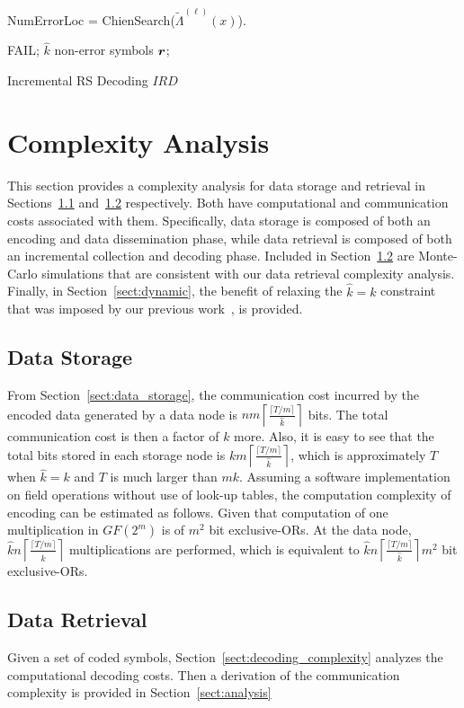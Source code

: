 \documentclass[10pt,journal,letterpaper,compsoc]{IEEEtran}
\newcommand{\bm}{\boldmath}
\newcommand{\rr}{\mbox{\bm $r$}}
\newcommand{\0}{{\bf 0}}
\begin{document}
\begin{algorithm}[h]
{NumErrorLoc = ChienSearch($\tilde\Lambda^{(\ell)}(x)$). 

  {
\Return FAIL;
}
\Return $\hat{k}$ non-error symbols $\rr$;
}
\label{algo:incremental}
\caption{Incremental RS Decoding $IRD$}
\end{algorithm}
\section{Complexity Analysis}
\label{sect:complexity}
This section provides a complexity analysis for data storage and retrieval in Sections~\ref{sect:enc_comm}
and~\ref{sect:retrieve} respectively. Both have computational and communication costs associated with them. Specifically, data
storage is composed of both an encoding and data dissemination phase, while data retrieval is composed of both an incremental collection
and decoding phase.
Included in 
Section~\ref{sect:retrieve} are Monte-Carlo simulations that are consistent with our data retrieval complexity analysis.
 Finally, in Section~\ref{sect:dynamic}, the benefit of relaxing the
$\hat{k}=k$ constraint that was imposed by our previous work~\cite{Han10-Infocom}, is provided.

\subsection{Data Storage}
\label{sect:enc_comm}
From Section~\ref{sect:data_storage}, the  communication cost incurred by the encoded data generated by a
data node is $nm\left\lceil\frac{\lceil T/m\rceil}{\hat{k}}\right\rceil$ bits. The total communication cost 
is then a factor of $k$ more.
Also, it is easy to see that the total bits stored in each storage node is
$km\left\lceil\frac{\lceil T/m\rceil}{\hat{k}}\right\rceil$, which is approximately
$T$ when $\hat{k}=k$ and $T$ is much larger than $mk$. 
Assuming a software implementation on field operations without use of look-up tables,
the computation complexity of encoding can be estimated as follows. 
Given that computation of one multiplication in $GF(2^m)$ is of $m^2$ bit
exclusive-ORs. At the data node, $\hat{k}n\left\lceil\frac{\lceil
T/m\rceil}{\hat{k}}\right\rceil$ multiplications are performed, which is equivalent
to $\hat{k}n\left\lceil\frac{\lceil T/m\rceil}{\hat{k}}\right\rceil m^2$ bit exclusive-ORs.
\subsection{Data Retrieval}
\label{sect:retrieve}
Given a set of coded symbols, Section~\ref{sect:decoding_complexity}
analyzes the computational decoding costs. Then a derivation of the 
communication complexity is provided in Section~\ref{sect:analysis}
\end{document}
